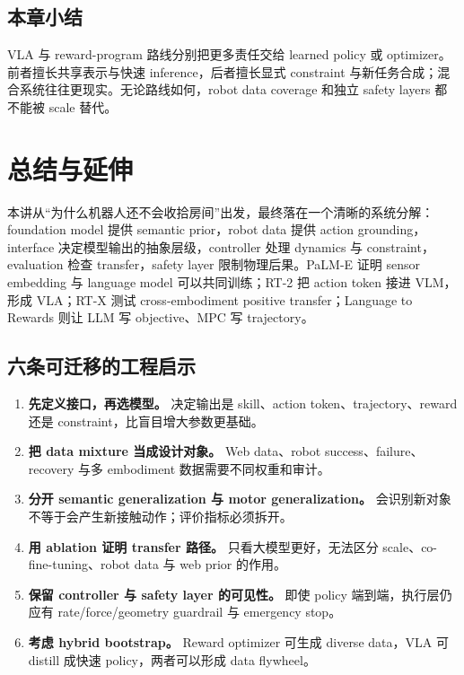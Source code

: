 \documentclass[a4paper]{article}
\begin{document}
\subsection{本章小结}

VLA 与 reward-program 路线分别把更多责任交给 learned policy 或 optimizer。前者擅长共享表示与快速 inference，后者擅长显式 constraint 与新任务合成；混合系统往往更现实。无论路线如何，robot data coverage 和独立 safety layers 都不能被 scale 替代。

\section{总结与延伸}

本讲从“为什么机器人还不会收拾房间”出发，最终落在一个清晰的系统分解：foundation model 提供 semantic prior，robot data 提供 action grounding，interface 决定模型输出的抽象层级，controller 处理 dynamics 与 constraint，evaluation 检查 transfer，safety layer 限制物理后果。PaLM-E 证明 sensor embedding 与 language model 可以共同训练；RT-2 把 action token 接进 VLM，形成 VLA；RT-X 测试 cross-embodiment positive transfer；Language to Rewards 则让 LLM 写 objective、MPC 写 trajectory。

\subsection{六条可迁移的工程启示}

\begin{enumerate}
  \item \textbf{先定义接口，再选模型。} 决定输出是 skill、action token、trajectory、reward 还是 constraint，比盲目增大参数更基础。
  \item \textbf{把 data mixture 当成设计对象。} Web data、robot success、failure、recovery 与多 embodiment 数据需要不同权重和审计。
  \item \textbf{分开 semantic generalization 与 motor generalization。} 会识别新对象不等于会产生新接触动作；评价指标必须拆开。
  \item \textbf{用 ablation 证明 transfer 路径。} 只看大模型更好，无法区分 scale、co-fine-tuning、robot data 与 web prior 的作用。
  \item \textbf{保留 controller 与 safety layer 的可见性。} 即使 policy 端到端，执行层仍应有 rate/force/geometry guardrail 与 emergency stop。
  \item \textbf{考虑 hybrid bootstrap。} Reward optimizer 可生成 diverse data，VLA 可 distill 成快速 policy，两者可以形成 data flywheel。
\end{enumerate}
\end{document}
